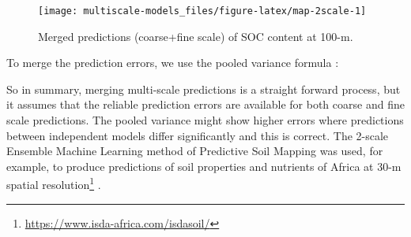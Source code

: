 \documentclass[
  graybox,natbib,nospthms]{svmono}
\newenvironment{Shaded}{\begin{snugshade}}{\end{snugshade}}
\newcommand{\AttributeTok}[1]{\textcolor[rgb]{0.61,0.61,0.61}{#1}}
\newcommand{\CommentTok}[1]{\textcolor[rgb]{0.37,0.37,0.37}{\textit{#1}}}
\newcommand{\ControlFlowTok}[1]{\textcolor[rgb]{0.27,0.27,0.27}{\textbf{#1}}}
\newcommand{\FunctionTok}[1]{\textcolor[rgb]{0,0,0}{#1}}
\newcommand{\NormalTok}[1]{#1}
\newcommand{\OtherTok}[1]{\textcolor[rgb]{0.37,0.37,0.37}{#1}}
\newcommand{\SpecialCharTok}[1]{\textcolor[rgb]{0,0,0}{#1}}
\newcommand{\StringTok}[1]{\textcolor[rgb]{0.5,0.5,0.5}{#1}}
\renewcommand{\href}[2]{#2 (\url{#1})}
\renewcommand{\href}[2]{#2\footnote{\url{#1}}}
\begin{document}
\begin{figure}

{\centering \texttt{[image: multiscale-models\_files/figure-latex/map-2scale-1]} 

}

\caption{Merged predictions (coarse+fine scale) of SOC content at 100-m.}\label{fig:map-2scale}
\end{figure}

To merge the prediction errors, we use the pooled variance formula \citep{rudmin2010calculating}:

\begin{Shaded}
\end{Shaded}

So in summary, merging multi-scale predictions is a straight forward process,
but it assumes that the reliable prediction errors are available for both coarse and fine scale predictions.
The pooled variance might show higher errors where predictions between independent
models differ significantly and this is correct. The 2-scale Ensemble Machine
Learning method of Predictive Soil Mapping was used, for example, to produce
predictions of \href{https://www.isda-africa.com/isdasoil/}{soil properties and nutrients of Africa at 30-m spatial resolution} \citep{hengl2021african}.
\end{document}
